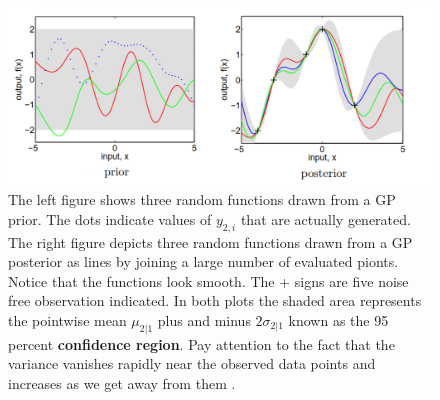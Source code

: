 \documentclass[10pt]{article}
\theoremstyle{definition}
\begin{document}
\begin{figure}[t!]
\centering
\includegraphics[width=12cm]{figs/prior-posterior.png}
\caption{The left figure shows three random functions drawn from a GP prior. The dots indicate values of $y_{2,i}$ that are actually generated. The right figure depicts three random functions drawn from a GP posterior as lines by joining a large number of evaluated pionts. Notice that the functions look smooth. The + signs are five noise free observation indicated. In both plots the shaded area represents the pointwise mean $\mu_{2|1}$ plus and minus $2\sigma_{2|1}$ known as the 95 percent \textbf{confidence region}. Pay attention to the fact that the variance vanishes rapidly near the observed data points and increases as we get away from them \cite{Rasmussen2006}.}
\label{fig:prior:posterior}
\end{figure}
\end{document}
